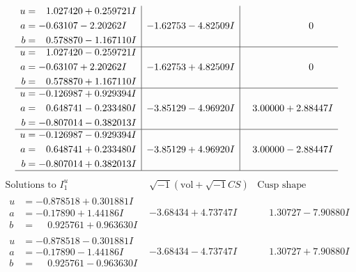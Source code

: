 \documentclass[1p]{elsarticle_modified}
\theoremstyle{definition}
\newcommand{\I}{\sqrt{-1}}
\begin{document}
$$\begin{array}{c|c|c}
\begin{aligned}
u &= \phantom{-}1.027420 + 0.259721 I \\
a &= -0.63107 - 2.20262 I \\
b &= \phantom{-}0.578870 - 1.167110 I\end{aligned}
 & -1.62753 - 4.82509 I & \phantom{-0.000000 } 0 \\ \hline\begin{aligned}
u &= \phantom{-}1.027420 - 0.259721 I \\
a &= -0.63107 + 2.20262 I \\
b &= \phantom{-}0.578870 + 1.167110 I\end{aligned}
 & -1.62753 + 4.82509 I & \phantom{-0.000000 } 0 \\ \hline\begin{aligned}
u &= -0.126987 + 0.929394 I \\
a &= \phantom{-}0.648741 - 0.233480 I \\
b &= -0.807014 - 0.382013 I\end{aligned}
 & -3.85129 - 4.96920 I & \phantom{-}3.00000 + 2.88447 I \\ \hline\begin{aligned}
u &= -0.126987 - 0.929394 I \\
a &= \phantom{-}0.648741 + 0.233480 I \\
b &= -0.807014 + 0.382013 I\end{aligned}
 & -3.85129 + 4.96920 I & \phantom{-}3.00000 - 2.88447 I\\
 \hline 
 \end{array}$$\newpage$$\begin{array}{c|c|c}  
\text{Solutions to }I^u_{1}& \I (\text{vol} + \sqrt{-1}CS) & \text{Cusp shape}\\
 \hline 
\begin{aligned}
u &= -0.878518 + 0.301881 I \\
a &= -0.17890 + 1.44186 I \\
b &= \phantom{-}0.925761 + 0.963630 I\end{aligned}
 & -3.68434 + 4.73747 I & \phantom{-}1.30727 - 7.90880 I \\ \hline\begin{aligned}
u &= -0.878518 - 0.301881 I \\
a &= -0.17890 - 1.44186 I \\
b &= \phantom{-}0.925761 - 0.963630 I\end{aligned}
 & -3.68434 - 4.73747 I & \phantom{-}1.30727 + 7.90880 I \\ \hline\begin{aligned}

\end{aligned}
\end{array}$$
\end{document}
